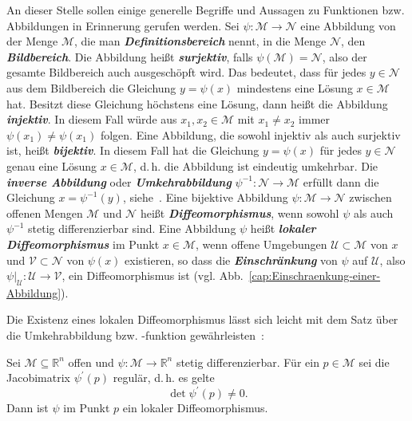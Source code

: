 \begin{remark}
\label{rem:Umkehrabbildung-Diffeomorphismus}An dieser Stelle sollen
einige generelle Begriffe und Aussagen zu Funktionen bzw. Abbildungen
in Erinnerung gerufen werden.
Sei $\psi:\mathcal{M}\to\mathcal{N}$
eine Abbildung von der Menge $\mathcal{M}$, die man \textbf{\em Definitionsbereich}
nennt, in die Menge $\mathcal{N}$, den \textbf{\em Bildbereich}. Die Abbildung
heißt \textbf{\em surjektiv}, falls $\psi(\mathcal{M})=\mathcal{N}$,
also der gesamte Bildbereich auch ausgeschöpft wird. Das bedeutet,
dass für jedes $y\in\mathcal{N}$ aus dem Bildbereich die Gleichung
$y=\psi(x)$ mindestens eine Lösung $x\in\mathcal{M}$ hat.
Besitzt
diese Gleichung höchstens eine Lösung, dann heißt die Abbildung \textbf{\em injektiv}.
In diesem Fall würde aus $x_{1},x_{2}\in\mathcal{M}$ mit $x_{1}\neq x_{2}$
immer $\psi(x_{1})\neq\psi(x_{1})$ folgen.
Eine Abbildung, die sowohl
injektiv als auch surjektiv ist, heißt \textbf{\em bijektiv}.
In diesem Fall hat die Gleichung $y=\psi(x)$ für jedes $y\in\mathcal{N}$
genau eine Lösung $x\in\mathcal{M}$, d.\,h. die Abbildung ist eindeutig
umkehrbar.
Die \textbf{\em inverse Abbildung} oder \textbf{\em Umkehrabbildung}
$\psi^{-1}:\mathcal{N}\to\mathcal{M}$ erfüllt dann die Gleichung
$x=\psi^{-1}(y)$, siehe~\cite{zeidler2003}. Eine bijektive Abbildung
$\psi:\mathcal{M}\to\mathcal{N}$ zwischen offenen Mengen $\mathcal{M}$
und $\mathcal{N}$ heißt \textbf{\em Diffeomorphismus},
wenn sowohl $\psi$ als auch $\psi^{-1}$ stetig differenzierbar sind.
Eine Abbildung $\psi$ heißt \textbf{\em lokaler Diffeomorphismus}
im Punkt $x\in\mathcal{M}$, wenn offene Umgebungen $\mathcal{U}\subset\mathcal{M}$
von $x$ und $\mathcal{V}\subset\mathcal{N}$ von $\psi(x)$ existieren,
so dass die \textbf{\em Einschränkung} von $\psi$ auf $\mathcal{U}$, also
$\left.\psi\right|_{\mathcal{U}}:\mathcal{U}\to\mathcal{V}$, ein
Diffeomorphismus ist (vgl. Abb.~\ref{cap:Einschraenkung-einer-Abbildung}).
\end{remark}

Die Existenz eines lokalen Diffeomorphismus lässt sich leicht mit
dem Satz über die Umkehrabbildung bzw. -funktion gewährleisten~\cite{hildebrandt2003-2,kerner2007}:
\begin{theorem}
\label{thm: Umkehrfunktion}Sei
$\mathcal{M}\subseteq{\mathbb{R}}^{n}$ offen und $\psi:\mathcal{M}\to{\mathbb{R}}^{n}$
stetig differenzierbar. Für ein $p\in\mathcal{M}$ sei die Jacobimatrix
$\psi^{\prime}(p)$ regulär, d.\,h. es gelte
\[
\det\psi^{\prime}(p)\neq0.
\]
Dann ist $\psi$ im Punkt $p$ ein lokaler Diffeomorphismus.
\end{theorem}


